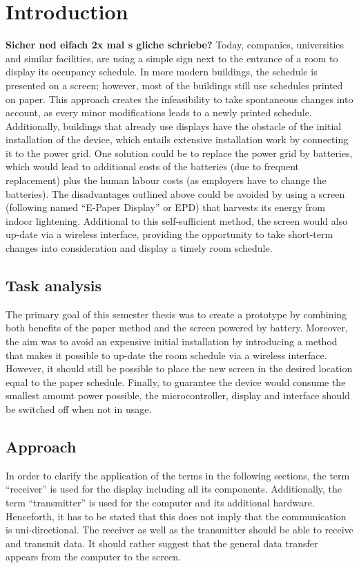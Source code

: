 \chapter{Introduction}
\textbf{Sicher ned eifach 2x mal s gliche schriebe?}
Today, companies, universities and similar facilities, are using a simple sign next to the entrance of a room to display its occupancy schedule. In more modern buildings, the schedule is presented on a screen; however, most of the buildings still use schedules printed on paper. This approach creates the infeasibility to take spontaneous changes into account, as every minor modifications leads to a newly printed schedule. Additionally, buildings that already use displays have the obstacle of the initial installation of the device, which entails extensive installation work by connecting it to the power grid. One solution could be to replace the power grid by batteries, which would lead to additional costs of the batteries (due to frequent replacement) plus the human labour costs (as employers have to change the batteries). The disadvantages outlined above could be avoided by using a screen (following named “E-Paper Display” or EPD) that harvests its energy from indoor lightening. Additional to this self-sufficient method, the screen would also up-date via a wireless interface, providing the opportunity to take short-term changes into consideration and display a timely room schedule.  


\section{Task analysis}
The primary goal of this semester thesis was to create a prototype by combining both benefits of the paper method and the screen powered by battery. Moreover, the aim was to avoid an expensive initial installation by introducing a method that makes it possible to up-date the room schedule via a wireless interface. However, it should still be possible to place the new screen in the desired location equal to the paper schedule. Finally, to guarantee the device would consume the smallest amount power possible, the microcontroller, display and interface should be switched off when not in usage.  


\section{Approach}
In order to clarify the application of the terms in the following sections, the term “receiver” is used for the display including all its components. Additionally, the term “transmitter” is used for the computer and its additional hardware. Henceforth, it has to be stated that this does not imply that the communication is uni-directional. The receiver as well as the transmitter should be able to receive and transmit data. It should rather suggest that the general data transfer appears from the computer to the screen. 

